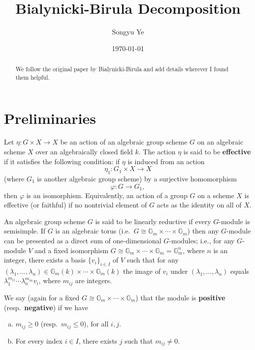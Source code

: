 \documentclass[12pt]{article}
\begin{document}
\rhead{\today}
\cfoot{\thepage}

\title{Bialynicki-Birula Decomposition}

\author{Songyu Ye}
\date{\today}
\maketitle


\begin{abstract}
We follow the original paper by Bialynicki-Birula and add details wherever I found them helpful.
\end{abstract}

\tableofcontents

\section{Preliminaries}
Let $\eta : G \times X \to X$ be an action of an algebraic group scheme $G$ on an algebraic scheme $X$ over an algebraically closed field $k$. The action $\eta$ is said to be \textbf{effective} if it satisfies the following condition:  
if $\eta$ is induced from an action 
\[
   \eta_1 : G_1 \times X \longrightarrow X
\]
(where $G_1$ is another algebraic group scheme) by a surjective homomorphism 
\[
   \varphi : G \longrightarrow G_1,
\] 
then $\varphi$ is an isomorphism. Equivalently, an action of a group $G$ on a scheme $X$ is effective (or faithful) if no nontrivial element of $G$ acts as the identity on all of $X$.

An algebraic group scheme $G$ is said to be linearly reductive if every 
$G$-module is semisimple. If $G$ is an algebraic torus (i.e.\ $G \cong \mathbb{G}_m \times \cdots \times \mathbb{G}_m$) 
then any $G$-module can be presented as a direct sum of one-dimensional 
$G$-modules; i.e., for any $G$-module $V$ and a fixed isomorphism 
$G \cong \mathbb{G}_m \times \cdots \times \mathbb{G}_m = \mathbb{G}_m^n$, 
where $n$ is an integer, there exists a basis $\{v_i\}_{i\in I}$ of $V$ such that 
for any $(\lambda_1,\dots,\lambda_n) \in \mathbb{G}_m(k) \times \cdots \times \mathbb{G}_m(k)$ 
the image of $v_i$ under $(\lambda_1,\dots,\lambda_n)$ equals 
$\lambda_1^{m_{i1}} \cdots \lambda_n^{m_{in}} v_i$, where $m_{ij}$ are integers.  

We say (again for a fixed $G \cong \mathbb{G}_m \times \cdots \times \mathbb{G}_m$) 
that the module is \textbf{positive} (resp.\ \textbf{negative}) if we have
\begin{enumerate}[(a)]
\item $m_{ij} \ge 0$ (resp.\ $m_{ij} \le 0$), for all $i,j$.
\item For every index $i \in I$, there exists $j$ such that $m_{ij} \ne 0$.
\end{enumerate}
\end{document}
